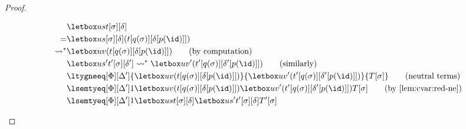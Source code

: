 \begin{proof}
\begin{itemize}[label=Case]
\begin{itemize}[label=Subcase]
\begin{align*}
             & \letbox u s t[\sigma][\delta] \\
        = & \letbox u {s[\sigma][\delta]}{(t[q(\sigma)][\delta[p(\id)]])} \\
        \rightsquigarrow^\ast & \letbox u
                                {v}{(t[q(\sigma)][\delta[p(\id)]])} 
                                \tag*{(by computation)} \\        
             & \letbox u{s'}{t'}[\sigma][\delta'] 
               \rightsquigarrow^\ast \letbox u
               {v'}{(t'[q(\sigma)][\delta'[p(\id)]])} 
               \tag*{(similarly)} \\
             & \ltygneeq[\Phi][\Delta']{\letbox u
               {v}{(t[q(\sigma)][\delta[p(\id)]])} }
               {\letbox u {v'}{(t'[q(\sigma)][\delta'[p(\id)]])} }{T[\sigma]}
               \tag*{(neutral terms)} \\
             & \lsemtyeq[\Phi][\Delta']1{\letbox u
               {v}{(t[q(\sigma)][\delta[p(\id)]])} }
               {\letbox u {v'}{(t'[q(\sigma)][\delta'[p(\id)]])} }{T[\sigma]}
               \tag*{(by \Cref{lem:cvar:red-ne})} \\
             & \lsemtyeq[\Phi][\Delta'] 1 {\letbox u s t[\sigma][\delta]}{\letbox u {s'}{t'}[\sigma][\delta]}{T'[\sigma]}
      \end{align*}
    \end{itemize}


\end{itemize}
\end{proof}
